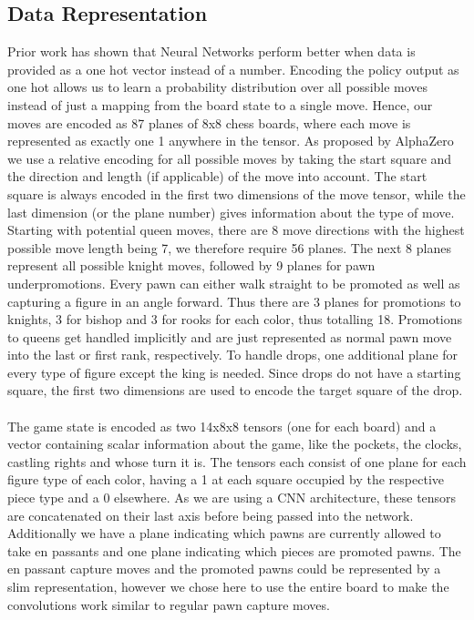 \subsection{Data Representation}
\label{subsec:rep}
Prior work\cite{priorwork} has shown that Neural Networks perform better when data is provided as a one hot vector instead of a number.
Encoding the policy output as one hot allows us to learn a probability distribution over all possible moves instead of just a mapping from the board state to a single move.
Hence, our moves are encoded as 87 planes of 8x8 chess boards, where each move is represented as exactly one 1 anywhere in the tensor.
As proposed by AlphaZero\cite{alphazero} we use a relative encoding for all possible moves by taking the start square and the direction and length (if applicable) of the move into account.
The start square is always encoded in the first two dimensions of the move tensor, while the last dimension (or the plane number) gives information about the type of move.
Starting with potential queen moves, there are 8 move directions with the highest possible move length being 7, we therefore require 56 planes.
The next 8 planes represent all possible knight moves, followed by 9 planes for pawn underpromotions.
Every pawn can either walk straight to be promoted as well as capturing a figure in an angle forward.
Thus there are 3 planes for promotions to knights, 3 for bishop and 3 for rooks for each color, thus totalling 18.
Promotions to queens get handled implicitly and are just represented as normal pawn move into the last or first rank, respectively.
To handle drops, one additional plane for every type of figure except the king is needed.
Since drops do not have a starting square, the first two dimensions are used to encode the target square of the drop.
\\\\
The game state is encoded as two 14x8x8 tensors (one for each board) and a vector containing scalar information about the game, like the pockets, the clocks, castling rights and whose turn it is.
The tensors each consist of one plane for each figure type of each color, having a 1 at each square occupied by the respective piece type and a 0 elsewhere.
As we are using a CNN architecture, these tensors are concatenated on their last axis before being passed into the network.
Additionally we have a plane indicating which pawns are currently allowed to take en passants and one plane indicating which pieces are promoted pawns.
The en passant capture moves and the promoted pawns could be represented by a slim representation, however we chose here to use the entire board to make the convolutions work similar to regular pawn capture moves.
